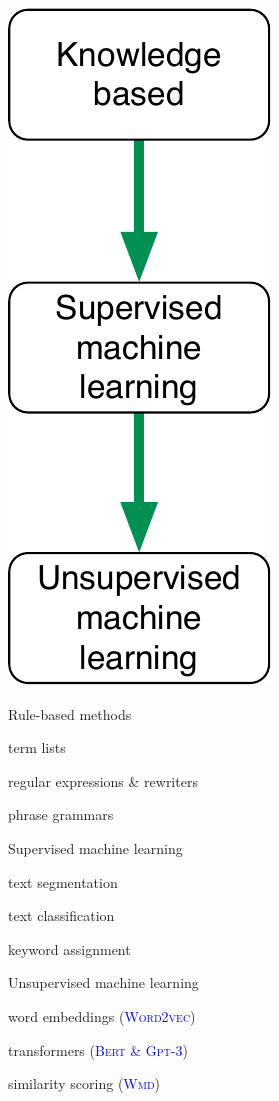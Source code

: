 \documentclass[landscape,footrule]{foils}
\begin{document}
\includegraphics[scale=1.0, trim=0cm -1.375cm 0cm 0cm, clip]{methods-hierarchy}
\hspace*{0.5cm}
\begin{minipage}[b]{12cm}
Rule-based methods 
\begin{triangles}
\item term lists 
\item regular expressions \& rewriters
\item phrase grammars    
\end{triangles}\vspace*{4ex}
Supervised machine learning
\begin{triangles}
\item text segmentation
\item text classification 
\item keyword assignment
\end{triangles}\vspace*{3ex}

Unsupervised machine learning 
\begin{triangles}
\item word embeddings (\textcolor{blue}{\textsc{Word2vec}}) 
\item transformers (\textcolor{blue}{\textsc{Bert} \& \textsc{Gpt-3}}) 
\item similarity scoring (\textcolor{blue}{\textsc{Wmd}})
\end{triangles} \vspace*{2ex}
\end{minipage}
\end{document}
